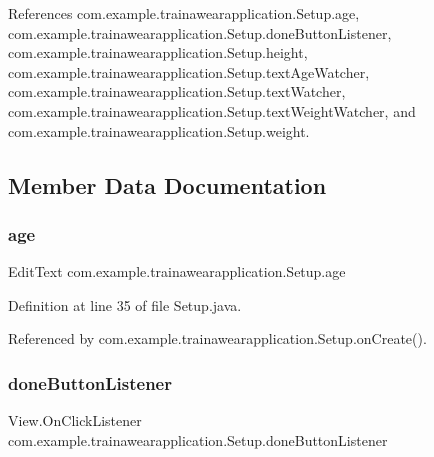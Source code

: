 References com.\+example.\+trainawearapplication.\+Setup.\+age, com.\+example.\+trainawearapplication.\+Setup.\+done\+Button\+Listener, com.\+example.\+trainawearapplication.\+Setup.\+height, com.\+example.\+trainawearapplication.\+Setup.\+text\+Age\+Watcher, com.\+example.\+trainawearapplication.\+Setup.\+text\+Watcher, com.\+example.\+trainawearapplication.\+Setup.\+text\+Weight\+Watcher, and com.\+example.\+trainawearapplication.\+Setup.\+weight.



\subsection{Member Data Documentation}
\mbox{\label{classcom_1_1example_1_1trainawearapplication_1_1_setup_a6a433af5ff4ce9c333fceeb78c680f37}} 
\subsubsection{\texorpdfstring{age}{age}}
{\footnotesize\ttfamily Edit\+Text com.\+example.\+trainawearapplication.\+Setup.\+age\hspace{0.3cm}{\ttfamily [package]}}



Definition at line 35 of file Setup.\+java.



Referenced by com.\+example.\+trainawearapplication.\+Setup.\+on\+Create().

\mbox{\label{classcom_1_1example_1_1trainawearapplication_1_1_setup_a6e717a2baaf80c283f516c044ae98e6c}} 
\subsubsection{\texorpdfstring{doneButtonListener}{doneButtonListener}}
{\footnotesize\ttfamily View.\+On\+Click\+Listener com.\+example.\+trainawearapplication.\+Setup.\+done\+Button\+Listener\hspace{0.3cm}{\ttfamily [private]}}

